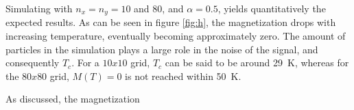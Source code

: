 Simulating with $n_x = n_y = 10$ and $80$, and $\alpha = 0.5$, yields quantitatively the expected results.
As can be seen in figure \ref{fig:h}, the magnetization drops with increasing temperature, 
eventually becoming approximately zero. 
The amount of particles in the simulation plays a large role in the noise of the signal, 
and consequently $T_c$. For a $10x10$ grid, $T_c$ can be said to be around \SI{29}{\kelvin},
whereas for the $80x80$ grid, $M(T)=0$ is not reached within \SI{50}{\kelvin}.

As discussed, the magnetization 


% 
